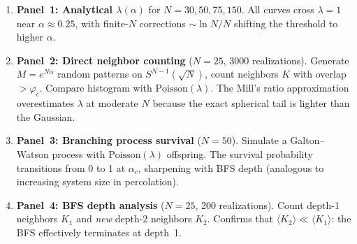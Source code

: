 \documentclass[11pt]{article}
\newcommand{\vp}{\varphi}
\begin{document}
\begin{enumerate}
  \item \textbf{Panel~1: Analytical $\lambda(\alpha)$}
    for $N = 30, 50, 75, 150$.
    All curves cross $\lambda = 1$ near $\alpha \approx 0.25$,
    with finite-$N$ corrections $\sim \ln N / N$ shifting
    the threshold to higher $\alpha$.

  \item \textbf{Panel~2: Direct neighbor counting}
    ($N = 25$, 3000 realizations).
    Generate $M = e^{N\alpha}$ random patterns on $S^{N-1}(\sqrt{N})$,
    count neighbors $K$ with overlap $> \vp_c$.
    Compare histogram with $\mathrm{Poisson}(\lambda)$.
    The Mill's ratio approximation overestimates $\lambda$ at
    moderate $N$ because the exact spherical tail is lighter
    than the Gaussian.

  \item \textbf{Panel~3: Branching process survival}
    ($N = 50$).
    Simulate a Galton--Watson process with
    $\mathrm{Poisson}(\lambda)$ offspring.
    The survival probability transitions from 0 to 1 at
    $\alpha_c$, sharpening with BFS depth (analogous to
    increasing system size in percolation).

  \item \textbf{Panel~4: BFS depth analysis}
    ($N = 25$, 200 realizations).
    Count depth-1 neighbors $K_1$ and \emph{new} depth-2
    neighbors $K_2$.
    Confirms that $\langle K_2 \rangle \ll \langle K_1 \rangle$:
    the BFS effectively terminates at depth~1.
\end{enumerate}
\end{document}
